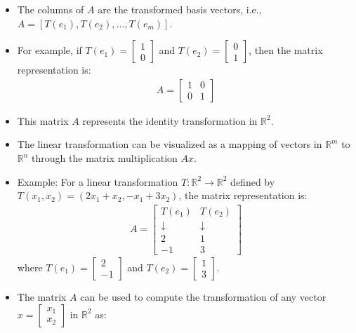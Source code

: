 \begin{frame}
    \begin{itemize}
     \item The columns of $A$ are the transformed basis vectors, i.e., $A = [T(e_1), T(e_2), \ldots, T(e_m)]$.
     \item For example, if  $T(e_1) = \begin{bmatrix} 1 \\ 0 \end{bmatrix}$ and $T(e_2) = \begin{bmatrix} 0 \\ 1 \end{bmatrix}$, then the matrix representation is:
     \begin{align*}
         A = \begin{bmatrix}
             1 & 0 \\
             0 & 1
         \end{bmatrix}
     \end{align*}
     \item This matrix $A$ represents the identity transformation in $\mathbb{R}^2$.
     \item The linear transformation can be visualized as a mapping of vectors in $\mathbb{R}^m$ to $\mathbb{R}^n$ through the matrix multiplication $Ax$.
    \end{itemize}
\end{frame}
\begin{frame}
    \begin{itemize}
        \item Example: For a linear transformation $T:\mathbb{R}^2 \rightarrow \mathbb{R}^2$ defined by $T(x_1, x_2) = (2x_1 + x_2, -x_1 + 3x_2)$, the matrix representation is:
        \begin{align*}
            A = \begin{bmatrix}
                T(e_1) & T(e_2) \\
                \downarrow & \downarrow \\
                2 & 1 \\
                -1 & 3
            \end{bmatrix}
        \end{align*}  
      where $T(e_1) = \begin{bmatrix} 2 \\ -1 \end{bmatrix}$ and $T(e_2) = \begin{bmatrix} 1 \\ 3 \end{bmatrix}$.
        \item The matrix $A$ can be used to compute the transformation of any vector $x = \begin{bmatrix} x_1 \\ x_2 \end{bmatrix}$ in $\mathbb{R}^2$ as:
    \end{itemize}
\end{frame}

